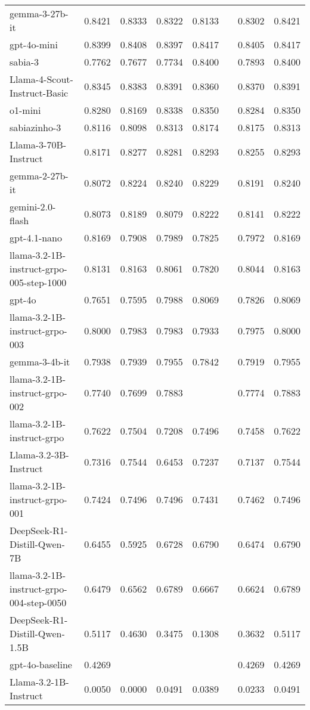 \begin{longtable}{lrllllrr}
gemma-3-27b-it & 0.8421 & 0.8333 & 0.8322 & 0.8133 &  & 0.8302 & 0.8421 \\
gpt-4o-mini & 0.8399 & 0.8408 & 0.8397 & 0.8417 &  & 0.8405 & 0.8417 \\
sabia-3 & 0.7762 & 0.7677 & 0.7734 & 0.8400 &  & 0.7893 & 0.8400 \\
Llama-4-Scout-Instruct-Basic & 0.8345 & 0.8383 & 0.8391 & 0.8360 &  & 0.8370 & 0.8391 \\
o1-mini & 0.8280 & 0.8169 & 0.8338 & 0.8350 &  & 0.8284 & 0.8350 \\
sabiazinho-3 & 0.8116 & 0.8098 & 0.8313 & 0.8174 &  & 0.8175 & 0.8313 \\
Llama-3-70B-Instruct & 0.8171 & 0.8277 & 0.8281 & 0.8293 &  & 0.8255 & 0.8293 \\
gemma-2-27b-it & 0.8072 & 0.8224 & 0.8240 & 0.8229 &  & 0.8191 & 0.8240 \\
gemini-2.0-flash & 0.8073 & 0.8189 & 0.8079 & 0.8222 &  & 0.8141 & 0.8222 \\
gpt-4.1-nano & 0.8169 & 0.7908 & 0.7989 & 0.7825 &  & 0.7972 & 0.8169 \\
llama-3.2-1B-instruct-grpo-005-step-1000 & 0.8131 & 0.8163 & 0.8061 & 0.7820 &  & 0.8044 & 0.8163 \\
gpt-4o & 0.7651 & 0.7595 & 0.7988 & 0.8069 &  & 0.7826 & 0.8069 \\
llama-3.2-1B-instruct-grpo-003 & 0.8000 & 0.7983 & 0.7983 & 0.7933 &  & 0.7975 & 0.8000 \\
gemma-3-4b-it & 0.7938 & 0.7939 & 0.7955 & 0.7842 &  & 0.7919 & 0.7955 \\
llama-3.2-1B-instruct-grpo-002 & 0.7740 & 0.7699 & 0.7883 &  &  & 0.7774 & 0.7883 \\
llama-3.2-1B-instruct-grpo & 0.7622 & 0.7504 & 0.7208 & 0.7496 &  & 0.7458 & 0.7622 \\
Llama-3.2-3B-Instruct & 0.7316 & 0.7544 & 0.6453 & 0.7237 &  & 0.7137 & 0.7544 \\
llama-3.2-1B-instruct-grpo-001 & 0.7424 & 0.7496 & 0.7496 & 0.7431 &  & 0.7462 & 0.7496 \\
DeepSeek-R1-Distill-Qwen-7B & 0.6455 & 0.5925 & 0.6728 & 0.6790 &  & 0.6474 & 0.6790 \\
llama-3.2-1B-instruct-grpo-004-step-0050 & 0.6479 & 0.6562 & 0.6789 & 0.6667 &  & 0.6624 & 0.6789 \\
DeepSeek-R1-Distill-Qwen-1.5B & 0.5117 & 0.4630 & 0.3475 & 0.1308 &  & 0.3632 & 0.5117 \\
gpt-4o-baseline & 0.4269 &  &  &  &  & 0.4269 & 0.4269 \\
Llama-3.2-1B-Instruct & 0.0050 & 0.0000 & 0.0491 & 0.0389 &  & 0.0233 & 0.0491 \\
\end{longtable}

